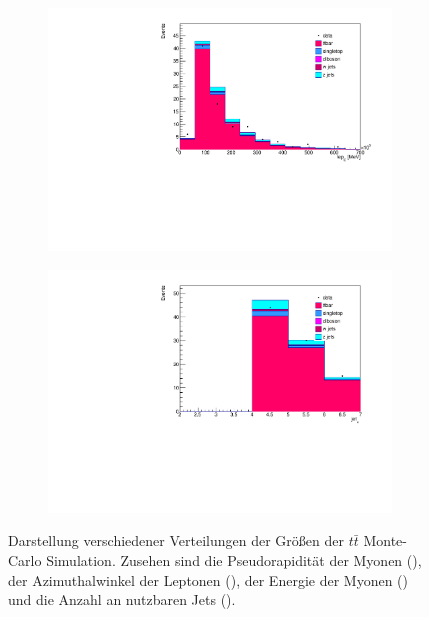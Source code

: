 \begin{figure}[H]
\begin{subfigure}{0.5\textwidth}
    \caption{}
    \label{fig:stacked_btagged2}
  \end{subfigure}%
  \newline
  \begin{subfigure}{0.5\textwidth}
    \centering
    \includegraphics[width=\linewidth]{plots_and_txt/stacked_plots/stacked_lep_E.pdf}
    \caption{}
    \label{fig:stacked_jet_pt_good2}
  \end{subfigure}%
  \begin{subfigure}{0.5\textwidth}
    \centering
    \includegraphics[width=\linewidth]{plots_and_txt/stacked_plots/stacked_jet_n.pdf}
    \caption{}
    \label{fig:stacked_met_et2}
  \end{subfigure}%
  \caption{Darstellung verschiedener Verteilungen der Größen der $t\bar{t}$ Monte-Carlo Simulation.
  Zusehen sind die Pseudorapidität der Myonen (), 
  der Azimuthalwinkel der Leptonen (), 
  der Energie der Myonen () und die Anzahl an nutzbaren Jets ().
  }
  \label{fig:stacked_Distributions2}
\end{figure}

